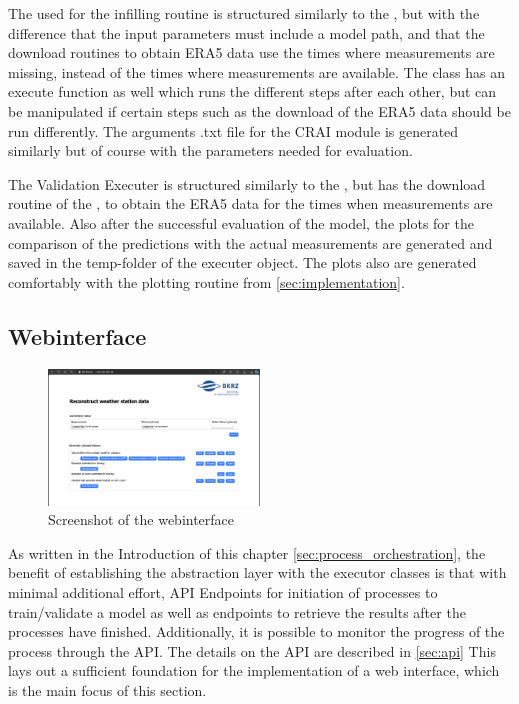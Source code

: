 The  used for the infilling routine is structured similarly to the , but with the difference that the input parameters must include a model path, and that the download routines to obtain ERA5 data use the times where measurements are missing, instead of the times where measurements are available. The class has an execute function as well which runs the different steps after each other, but can be manipulated if certain steps such as the download of the ERA5 data should be run differently. The arguments .txt file for the CRAI module is generated similarly but of course with the parameters needed for evaluation.

The Validation Executer is structured similarly to the , but has the download routine of the , to obtain the ERA5 data for the times when measurements are available. Also after the successful evaluation of the model, the plots for the comparison of the predictions with the actual measurements are generated and saved in the temp-folder of the executer object. The plots also are generated comfortably with the plotting routine from \autoref{sec:implementation}.

\subsection{Webinterface}

\begin{figure}
    \centering
    \includegraphics[width=0.5\textwidth]{resources/images/webinterface_screenshot.png}
    \caption{Screenshot of the webinterface}
    \label{fig:webinterface_screenshot}
\end{figure}

As written in the Introduction of this chapter \ref{sec:process_orchestration}, the benefit of establishing the abstraction layer with the executor classes is that with minimal additional effort, API Endpoints for initiation of processes to train/validate a model as well as endpoints to retrieve the results after the processes have finished. Additionally, it is possible to monitor the progress of the process through the API. The details on the API are described in \autoref{sec:api} This lays out a sufficient foundation for the implementation of a web interface, which is the main focus of this section.

